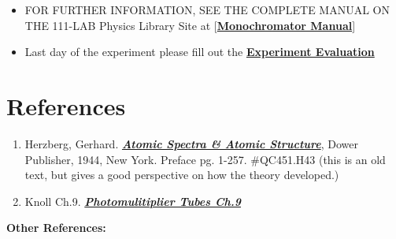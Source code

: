 \documentclass{../lab}
\begin{document}
\begin{itemize}
    \item FOR FURTHER INFORMATION, SEE THE COMPLETE MANUAL ON THE 111-LAB Physics Library Site at [\href{http://physics111.lib.berkeley.edu/Physics111/Equipment\_Manuals/ATM\_Equipment\_Manuals/07-monochrometerAM505.pdf}{\textbf{Monochromator Manual}}]

    \item Last day of the experiment please fill out the \href{\ExperimentEvaluation}{\textbf{Experiment Evaluation}}

\end{itemize}

\section{References}
\label{sec:References}

\begin{enumerate}
    \item Herzberg, Gerhard. \emph{\href{http://physics111.lib.berkeley.edu/Physics111/Reprints/ATM/02-2ndEd-Atomic\_Spectra\_and\_Atomic\_Structure.pdf}{\textbf{Atomic Spectra \& Atomic Structure}}}, Dower Publisher, 1944, New York. Preface pg. 1-257. \#QC451.H43 (this is an old text, but gives a good perspective on how the theory developed.)

    \item Knoll Ch.9. \emph{\href{http://physics111.lib.berkeley.edu/Physics111/Reprints/Knoll-Radiation\%20Detection\%20&\%20Measurement/01-Radiation\_Detection\_and\_Measurement\_CH\_09.pdf}{\textbf{Photomulitiplier Tubes Ch.9}}}

\end{enumerate}

\noindent\textbf{Other References:}
\end{document}
